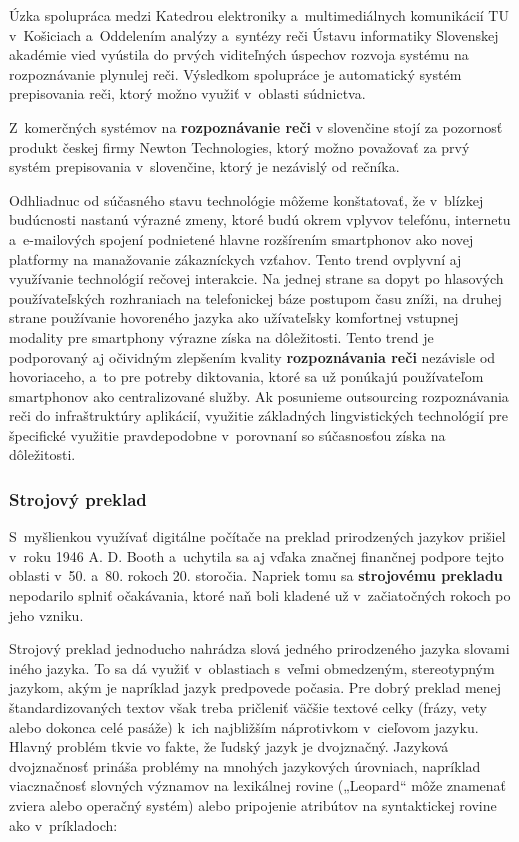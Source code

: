 \begin{multicols}{2}
Úzka spolupráca medzi Katedrou elektroniky a~multimediálnych komunikácií TU v~Košiciach a~Oddelením analýzy a~syntézy reči Ústavu informatiky Slovenskej akadémie vied vyústila do prvých viditeľných úspechov rozvoja systému na rozpoznávanie plynulej reči. Výsledkom spolupráce je automatický systém prepisovania reči, ktorý možno využiť v~oblasti súdnictva.

Z~komerčných systémov na \textbf{rozpoznávanie reči} v slovenčine stojí za pozornosť produkt českej firmy Newton Technologies, ktorý možno považovať za prvý systém prepisovania v~slovenčine, ktorý je nezávislý od rečníka.

Odhliadnuc od súčasného stavu technológie môžeme konštatovať, že v~blízkej budúcnosti nastanú výrazné zmeny, ktoré budú okrem vplyvov telefónu, internetu a~e-mailových spojení podnietené hlavne rozšírením smartphonov ako novej platformy na manažovanie zákazníckych vzťahov. Tento trend ovplyvní aj využívanie technológií rečovej interakcie. Na jednej strane sa dopyt po hlasových používateľských rozhraniach na telefonickej báze postupom času zníži, na druhej strane používanie hovoreného jazyka ako užívateľsky komfortnej vstupnej modality pre smartphony výrazne získa na dôležitosti. Tento trend je podporovaný aj očividným zlepšením kvality \textbf{rozpoznávania reči} nezávisle od hovoriaceho, a~to pre potreby diktovania, ktoré sa už ponúkajú používateľom smartphonov ako centralizované služby. Ak posunieme outsourcing rozpoznávania reči do infraštruktúry aplikácií, využitie základných lingvistických technológií pre špecifické využitie pravdepodobne v~porovnaní so súčasnosťou získa na dôležitosti.  

\subsubsection{Strojový preklad}
S~myšlienkou využívať digitálne počítače na preklad
prirodzených jazykov prišiel v~roku 1946 A. D. Booth a~uchytila sa aj
vďaka značnej finančnej podpore tejto oblasti v~50. a~80. rokoch 20.
storočia. Napriek tomu sa \textbf{strojovému prekladu} nepodarilo
splniť očakávania, ktoré naň boli kladené už v~začiatočných
rokoch po jeho vzniku.

Strojový preklad jednoducho nahrádza slová jedného prirodzeného
jazyka slovami iného jazyka. To sa dá využiť v~oblastiach s~veľmi
obmedzeným, stereotypným jazykom, akým je napríklad jazyk predpovede
počasia. Pre dobrý preklad menej štandardizovaných textov však
treba pričleniť väčšie textové celky (frázy, vety alebo dokonca
celé pasáže) k~ich najbližším náprotivkom v~cieľovom jazyku.
Hlavný problém tkvie vo fakte, že ľudský jazyk je dvojznačný.
Jazyková dvojznačnosť prináša problémy na mnohých jazykových
úrovniach, napríklad viacznačnosť slovných významov na
lexikálnej rovine („Leopard“ môže znamenať zviera alebo
operačný systém) alebo pripojenie atribútov na syntaktickej rovine
ako v~príkladoch:


\end{multicols}
